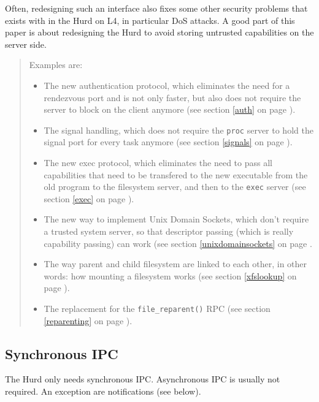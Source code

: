 \documentclass[9pt,a4paper]{extarticle}
\newenvironment{comment}{\footnotesize \begin{quote}}{\end{quote}}
\begin{document}
Often, redesigning such an interface also fixes some other security
problems that exists with in the Hurd on L4, in particular DoS
attacks.  A good part of this paper is about redesigning the Hurd to
avoid storing untrusted capabilities on the server side.

\begin{comment}
  Examples are:

  \begin{itemize}
  \item The new authentication protocol, which eliminates the need for
    a rendezvous port and is not only faster, but also does not
    require the server to block on the client anymore (see section
    \ref{auth} on page \pageref{auth}).
    
  \item The signal handling, which does not require the \texttt{proc}
    server to hold the signal port for every task anymore (see section
    \ref{signals} on page \pageref{signals}).
    
  \item The new exec protocol, which eliminates the need to pass all
    capabilities that need to be transfered to the new executable from
    the old program to the filesystem server, and then to the
    \texttt{exec} server (see section \ref{exec} on page
    \pageref{exec}).
    
  \item The new way to implement Unix Domain Sockets, which don't
    require a trusted system server, so that descriptor passing (which
    is really capability passing) can work (see section
    \ref{unixdomainsockets} on page \pageref{unixdomainsockets}.

  \item The way parent and child filesystem are linked to each other,
    in other words: how mounting a filesystem works (see section
    \ref{xfslookup} on page \pageref{xfslookup}).
    
  \item The replacement for the \verb/file_reparent()/ RPC (see
    section \ref{reparenting} on page \pageref{reparenting}).
  \end{itemize}
\end{comment}

\subsection{Synchronous IPC}

The Hurd only needs synchronous IPC.  Asynchronous IPC is usually not
required.  An exception are notifications (see below).
\end{document}
